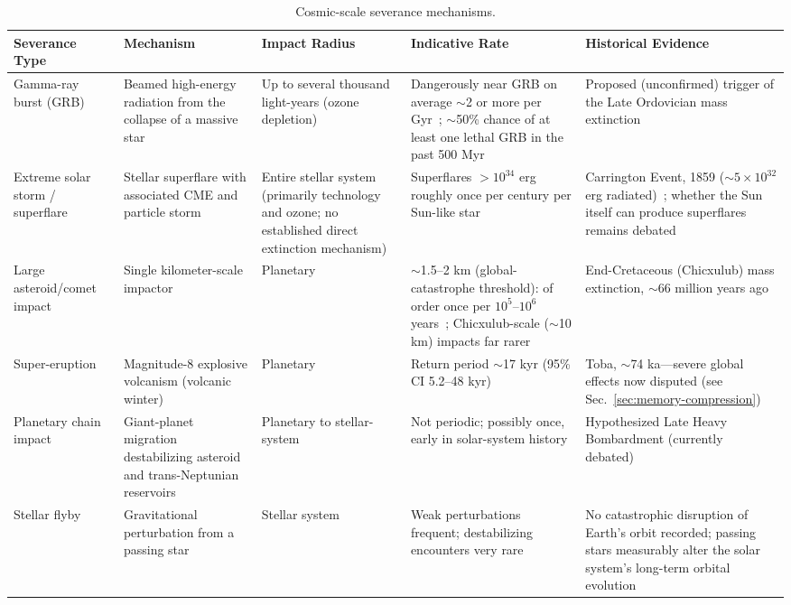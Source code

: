\documentclass[aps,prd,twocolumn,superscriptaddress,nofootinbib]{revtex4-2}
\begin{document}
\begin{table}[htbp]
\caption{Cosmic-scale severance mechanisms.}
\label{tab:severance}
\footnotesize
\begin{tabular}{P{0.108\textwidth}P{0.165\textwidth}P{0.140\textwidth}P{0.193\textwidth}P{0.241\textwidth}}
\toprule
Severance Type & Mechanism & Impact Radius & Indicative Rate & Historical Evidence \\
\midrule
Gamma-ray burst (GRB) & Beamed high-energy radiation from the collapse of a massive star & Up to several thousand light-years (ozone depletion) & Dangerously near GRB on average ${\sim}$2 or more per Gyr~\cite{Melott2004}; ${\sim}$50\% chance of at least one lethal GRB in the past 500 Myr~\cite{Piran2014} & Proposed (unconfirmed) trigger of the Late Ordovician mass extinction~\cite{Melott2004} \\
Extreme solar storm / superflare & Stellar superflare with associated CME and particle storm & Entire stellar system (primarily technology and ozone; no established direct extinction mechanism) & Superflares $>10^{34}$ erg roughly once per century per Sun-like star~\cite{Vasilyev2024} & Carrington Event, 1859 (${\sim}5\times10^{32}$ erg radiated)~\cite{Cliver2013}; whether the Sun itself can produce superflares remains debated \\
Large asteroid/comet impact & Single kilometer-scale impactor & Planetary & ${\sim}$1.5--2 km (global-catastrophe threshold): of order once per $10^{5}$--$10^{6}$ years~\cite{Chapman1994}; Chicxulub-scale (${\sim}$10 km) impacts far rarer & End-Cretaceous (Chicxulub) mass extinction, ${\sim}$66 million years ago~\cite{Schulte2010} \\
Super-eruption & Magnitude-8 explosive volcanism (volcanic winter) & Planetary & Return period ${\sim}$17 kyr (95\% CI 5.2--48 kyr)~\cite{Rougier2018} & Toba, ${\sim}$74 ka---severe global effects now disputed (see Sec.~\ref{sec:memory-compression}) \\
Planetary chain impact & Giant-planet migration destabilizing asteroid and trans-Neptunian reservoirs & Planetary to stellar-system & Not periodic; possibly once, early in solar-system history & Hypothesized Late Heavy Bombardment (currently debated)~\cite{Gomes2005} \\
Stellar flyby & Gravitational perturbation from a passing star & Stellar system & Weak perturbations frequent; destabilizing encounters very rare & No catastrophic disruption of Earth's orbit recorded; passing stars measurably alter the solar system's long-term orbital evolution~\cite{Kaib2024} \\

\end{tabular}
\end{table}
\end{document}
